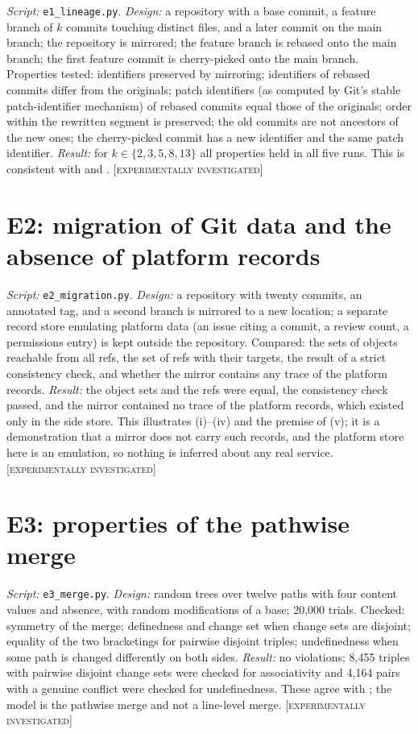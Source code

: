 \documentclass[11pt,twoside,openright]{book}
\theoremstyle{plain}
\theoremstyle{definition}
\theoremstyle{remark}
\newcommand{\Tested}{\textup{\textsc{[experimentally investigated]}}}
\begin{document}
\emph{Script:} \texttt{e1\_lineage.py}. \emph{Design:} a repository with a base commit, a feature branch of $k$ commits touching distinct files, and a later commit on the main branch; the repository is mirrored; the feature branch is rebased onto the main branch; the first feature commit is cherry-picked onto the main branch. Properties tested: identifiers preserved by mirroring; identifiers of rebased commits differ from the originals; patch identifiers (as computed by Git's stable patch-identifier mechanism) of rebased commits equal those of the originals; order within the rewritten segment is preserved; the old commits are not ancestors of the new ones; the cherry-picked commit has a new identifier and the same patch identifier. \emph{Result:} for $k\in\{2,3,5,8,13\}$ all properties held in all five runs. This is consistent with  and . \Tested{}

\section{E2: migration of Git data and the absence of platform records}

\emph{Script:} \texttt{e2\_migration.py}. \emph{Design:} a repository with twenty commits, an annotated tag, and a second branch is mirrored to a new location; a separate record store emulating platform data (an issue citing a commit, a review count, a permissions entry) is kept outside the repository. Compared: the sets of objects reachable from all refs, the set of refs with their targets, the result of a strict consistency check, and whether the mirror contains any trace of the platform records. \emph{Result:} the object sets and the refs were equal, the consistency check passed, and the mirror contained no trace of the platform records, which existed only in the side store. This illustrates (i)--(iv) and the premise of (v); it is a demonstration that a mirror does not carry such records, and the platform store here is an emulation, so nothing is inferred about any real service. \Tested{}

\section{E3: properties of the pathwise merge}

\emph{Script:} \texttt{e3\_merge.py}. \emph{Design:} random trees over twelve paths with four content values and absence, with random modifications of a base; 20{,}000 trials. Checked: symmetry of the merge; definedness and change set when change sets are disjoint; equality of the two bracketings for pairwise disjoint triples; undefinedness when some path is changed differently on both sides. \emph{Result:} no violations; 8{,}455 triples with pairwise disjoint change sets were checked for associativity and 4{,}164 pairs with a genuine conflict were checked for undefinedness. These agree with ; the model is the pathwise merge and not a line-level merge. \Tested{}
\end{document}
